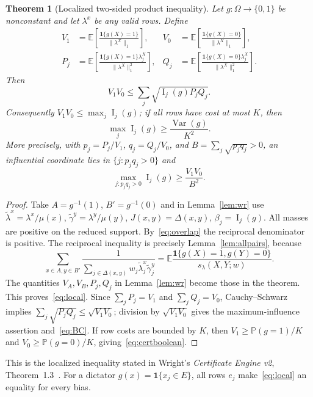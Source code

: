 \documentclass[11pt]{article}
\numberwithin{equation}{section}
\newtheorem{theorem}{Theorem}[section]
\theoremstyle{remark}
\newcommand{\E}{\mathbb E}
\newcommand{\Prb}{\mathbb P}
\newcommand{\Var}{\operatorname{Var}}
\newcommand{\one}{\mathbf 1}
\newcommand{\Inf}{\operatorname{I}}
\newcommand{\norm}[1]{\lVert #1\rVert}
\newcommand{\delt}{\Delta}
\begin{document}
\begin{theorem}[Localized two-sided product inequality]\label{thm:localized}
Let $g:\Omega\to\{0,1\}$ be nonconstant and let $\lambda^x$ be any valid rows. Define
\begin{align*}
 V_1&=\E\left[\frac{\one\{g(X)=1\}}{\norm{\lambda^X}_1}\right],
 &V_0&=\E\left[\frac{\one\{g(X)=0\}}{\norm{\lambda^X}_1}\right],\\
 P_j&=\E\left[\frac{\one\{g(X)=1\}\lambda_j^X}{\norm{\lambda^X}_1^2}\right],
 &Q_j&=\E\left[\frac{\one\{g(X)=0\}\lambda_j^X}{\norm{\lambda^X}_1^2}\right].
\end{align*}
Then
\begin{equation}\label{eq:local}
 V_1V_0\le\sum_j\sqrt{\Inf_j(g)P_jQ_j}.
\end{equation}
Consequently $V_1V_0\le\max_j\Inf_j(g)$; if all rows have cost at most $K$, then
\begin{equation}\label{eq:certboolean}
 \max_j\Inf_j(g)\ge\frac{\Var(g)}{K^2}.
\end{equation}
More precisely, with $p_j=P_j/V_1$, $q_j=Q_j/V_0$, and $B=\sum_j\sqrt{p_jq_j}>0$, an influential coordinate lies in $\{j:p_jq_j>0\}$ and
\begin{equation}\label{eq:BC}
 \max_{j:p_jq_j>0}\Inf_j(g)\ge\frac{V_1V_0}{B^2}.
\end{equation}
\end{theorem}
\begin{proof}
Take $A=g^{-1}(1)$, $B'=g^{-1}(0)$ and in Lemma~\ref{lem:wr} use
$\widetilde\lambda^x=\lambda^x/\mu(x)$,
$\widetilde\gamma^y=\lambda^y/\mu(y)$,
$J(x,y)=\delt(x,y)$, $\beta_j=\Inf_j(g)$.
All masses are positive on the reduced support. By~\eqref{eq:overlap} the reciprocal denominator is positive. The reciprocal inequality is precisely Lemma~\ref{lem:allpairs}, because
\[
 \sum_{x\in A,y\in B'}\frac1{\sum_{j\in\delt(x,y)}w_j\widetilde\lambda_j^x\widetilde\gamma_j^y}
 =\E\frac{\one\{g(X)=1,g(Y)=0\}}{s_\lambda(X,Y;w)}.
\]
The quantities $V_A,V_B,P_j,Q_j$ in Lemma~\ref{lem:wr} become those in the theorem. This proves~\eqref{eq:local}. Since $\sum_jP_j=V_1$ and $\sum_jQ_j=V_0$, Cauchy--Schwarz implies $\sum_j\sqrt{P_jQ_j}\le\sqrt{V_1V_0}$; division by $\sqrt{V_1V_0}$ gives the maximum-influence assertion and~\eqref{eq:BC}. If row costs are bounded by $K$, then $V_1\ge\Prb(g=1)/K$ and $V_0\ge\Prb(g=0)/K$, giving~\eqref{eq:certboolean}.
\end{proof}
This is the localized inequality stated in Wright's \emph{Certificate Engine v2}, Theorem~1.3~\cite{WriV2}. For a dictator $g(x)=\one\{x_j\in E\}$, all rows $e_j$ make~\eqref{eq:local} an equality for every bias.
\end{document}
